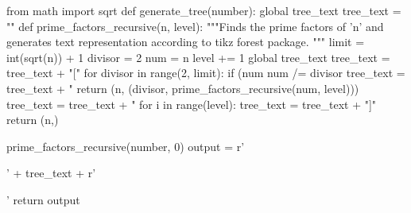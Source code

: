 \usepackage{mhocolorpalettesthlmnord}
\usepackage{mhofonts}
\usepackage{mhomacros}
\usepackage{mhotikz}
\usepackage{forest}
\usepackage{pythontex}
\begin{pycode}
from math import sqrt
def generate_tree(number):
        global tree_text
        tree_text = ""
        def prime_factors_recursive(n, level):
                """Finds the prime factors of 'n' and generates text representation
                     according to tikz forest package.
                """
                limit = int(sqrt(n)) + 1
                divisor = 2
                num = n
                level += 1
                global tree_text
                tree_text = tree_text + "["
                for divisor in range(2, limit):
                        if (num %
                                num /= divisor
                                tree_text = tree_text + "%
                                return (n, (divisor, prime_factors_recursive(num, level)))
                tree_text = tree_text + "%
                for i in range(level):
                        tree_text = tree_text + "]"
                return (n,)

        prime_factors_recursive(number, 0)
        output = r'\begin{forest}' + tree_text + r'\end{forest}'
        return output
\end{pycode}

\newcommand{\PrimeTree}[1]{%
\py{generate_tree(#1)}
}
